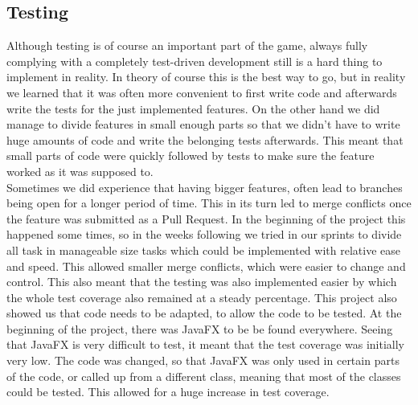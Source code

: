 \subsection{Testing}
Although testing is of course an important part of the game, always fully complying with a completely test-driven development still is a hard thing to implement in reality. In theory of course this is the best way to go, but in reality we learned that it was often more convenient to first write code and afterwards write the tests for the just implemented features. On the other hand we did manage to divide features in small enough parts so that we didn't have to write huge amounts of code and write the belonging tests afterwards. This meant that small parts of code were quickly followed by tests to make sure the feature worked as it was supposed to. \\
Sometimes we did experience that having bigger features, often lead to branches being open for a longer period of time. This in its turn led to merge conflicts once the feature was submitted as a Pull Request. In the beginning of the project this happened some times, so in the weeks following we tried in our sprints to divide all task in manageable size tasks which could be implemented with relative ease and speed. This allowed smaller merge conflicts, which were easier to change and control. This also meant that the testing was also implemented easier by which the whole test coverage also remained at a steady percentage. This project also showed us that code needs to be adapted, to allow the code to be tested. At the beginning of the project, there was JavaFX to be be found everywhere. Seeing that JavaFX is very difficult to test, it meant that the test coverage was initially very low. The code was changed, so that JavaFX was only used in certain parts of the code, or called up from a different class, meaning that most of the classes could be tested. This allowed for a huge increase in test coverage. 

